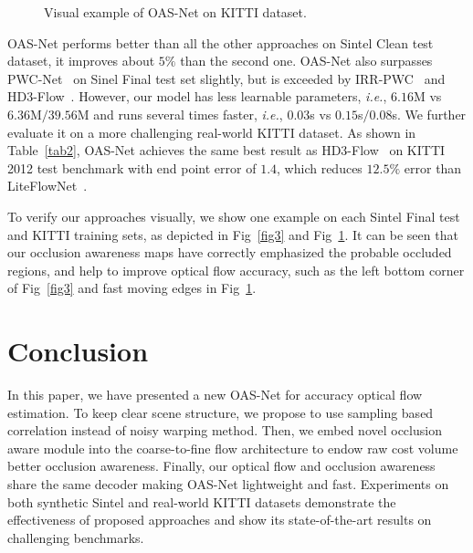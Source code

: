 \documentclass{article}
\begin{document}
\begin{figure}[!t]
	\captionsetup[subfigure]{farskip=1pt}
	\centering
	\newline
	\caption{Visual example of OAS-Net on KITTI dataset.}
	\label{fig4}
	\vspace{-0.5 em}
\end{figure}

OAS-Net performs better than all the other approaches on Sintel Clean test dataset, it improves about $5\%$ than the second one. OAS-Net also surpasses PWC-Net~\cite{Sun_2018_CVPR} on Sinel Final test set slightly, but is exceeded by IRR-PWC~\cite{Hur_2019_IRR} and HD3-Flow~\cite{Yin_2019_CVPR}. However, our model has less learnable parameters, \textit{i.e.}, $6.16$M vs $6.36$M$/$$39.56$M and runs several times faster, \textit{i.e.}, $0.03$s vs $0.15$s$/$$0.08$s. We further evaluate it on a more challenging real-world KITTI dataset. As shown in Table~\ref{tab2}, OAS-Net achieves the same best result as HD3-Flow~\cite{Yin_2019_CVPR} on KITTI 2012 test benchmark with end point error of $1.4$, which reduces $12.5\%$ error than LiteFlowNet~\cite{Hui_2018_CVPR}.

To verify our approaches visually, we show one example on each Sintel Final test and KITTI training sets, as depicted in Fig~\ref{fig3} and Fig~\ref{fig4}. It can be seen that our occlusion awareness maps have correctly emphasized the probable occluded regions, and help to improve optical flow accuracy, such as the left bottom corner of Fig~\ref{fig3} and fast moving edges in Fig~\ref{fig4}.

\section{Conclusion}
In this paper, we have presented a new OAS-Net for accuracy optical flow estimation. To keep clear scene structure, we propose to use sampling based correlation instead of noisy warping method. Then, we embed novel occlusion aware module into the coarse-to-fine flow architecture to endow raw cost volume better occlusion awareness. Finally, our optical flow and occlusion awareness share the same decoder making OAS-Net lightweight and fast. Experiments on both synthetic Sintel and real-world KITTI datasets demonstrate the effectiveness of proposed approaches and show its state-of-the-art results on challenging benchmarks.




\end{document}
